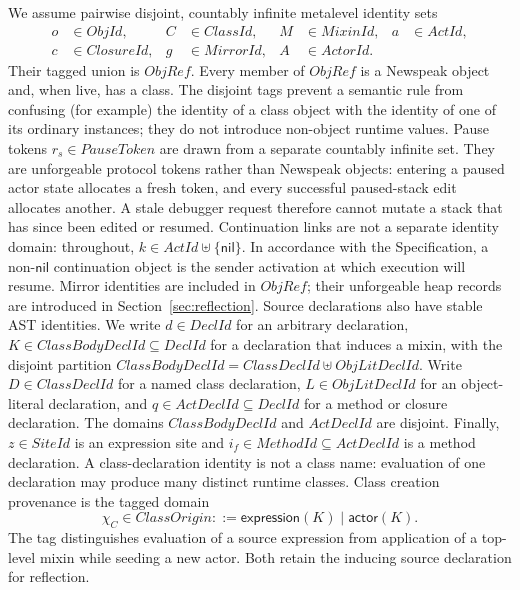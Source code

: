 \documentclass[11pt]{article}
\numberwithin{equation}{section}
\newcommand{\kw}[1]{\ensuremath{\mathsf{#1}}}
\newcommand{\nil}{\kw{nil}}
\begin{document}
We assume pairwise disjoint, countably infinite metalevel identity sets
\begin{equation}\label{eq:runtime-identities}
\begin{aligned}
  o&\in\mathit{ObjId}, & C&\in\mathit{ClassId}, &
  M&\in\mathit{MixinId}, & a&\in\mathit{ActId},\\
  c&\in\mathit{ClosureId}, & g&\in\mathit{MirrorId}, &
  A&\in\mathit{ActorId}. &&
\end{aligned}
\end{equation}
Their tagged union is $\mathit{ObjRef}$.  Every member of $\mathit{ObjRef}$ is
a Newspeak object and, when live, has a class.  The disjoint tags prevent a
semantic rule from confusing (for example) the identity of a class object with
the identity of one of its ordinary instances; they do not introduce
non-object runtime values.
Pause tokens $r_s\in\mathit{PauseToken}$ are drawn from a separate countably
infinite set.  They are unforgeable protocol tokens rather than Newspeak
objects: entering a paused actor state allocates a fresh token, and every
successful paused-stack edit allocates another.  A stale debugger request
therefore cannot mutate a stack that has since been edited or resumed.
Continuation links are not a separate identity domain: throughout,
$k\in\mathit{ActId}\uplus\{\nil\}$.  In accordance with the Specification, a
non-$\nil$ continuation object is the sender activation at which execution
will resume.  Mirror identities are included in $\mathit{ObjRef}$; their
unforgeable heap records are introduced in Section~\ref{sec:reflection}.
Source declarations also have stable AST identities.  We write
$d\in\mathit{DeclId}$ for an arbitrary declaration,
$K\in\mathit{ClassBodyDeclId}\subseteq\mathit{DeclId}$ for a declaration that
induces a mixin, with the disjoint partition
$\mathit{ClassBodyDeclId}=\mathit{ClassDeclId}\uplus\mathit{ObjLitDeclId}$.
Write $D\in\mathit{ClassDeclId}$ for a named class declaration,
$L\in\mathit{ObjLitDeclId}$ for an object-literal declaration, and
$q\in\mathit{ActDeclId}\subseteq\mathit{DeclId}$ for a method or closure
declaration.  The domains $\mathit{ClassBodyDeclId}$ and
$\mathit{ActDeclId}$ are disjoint.  Finally, $z\in\mathit{SiteId}$ is an
expression site and
$i_f\in\mathit{MethodId}\subseteq\mathit{ActDeclId}$ is a method declaration.
A class-declaration identity is not a class name: evaluation of one declaration
may produce many distinct runtime classes.
Class creation provenance is the tagged domain
\begin{equation}\label{eq:class-origin}
 \chi_C\in\mathit{ClassOrigin}::=
   \kw{expression}(K)\mid\kw{actor}(K).
\end{equation}
The tag distinguishes evaluation of a source expression from application of a
top-level mixin while seeding a new actor.  Both retain the inducing source
declaration for reflection.
\end{document}
